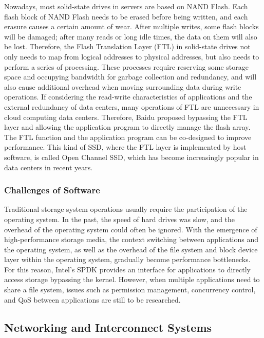Nowadays, most solid-state drives in servers are based on NAND Flash. Each flash block of NAND Flash needs to be erased before being written, and each erasure causes a certain amount of wear. After multiple writes, some flash blocks will be damaged; after many reads or long idle times, the data on them will also be lost. Therefore, the Flash Translation Layer (FTL) in solid-state drives not only needs to map from logical addresses to physical addresses, but also needs to perform a series of processing. These processes require reserving some storage space and occupying bandwidth for garbage collection and redundancy, and will also cause additional overhead when moving surrounding data during write operations. If considering the read-write characteristics of applications and the external redundancy of data centers, many operations of FTL are unnecessary in cloud computing data centers. Therefore, Baidu \cite{ouyang2013active} proposed bypassing the FTL layer and allowing the application program to directly manage the flash array. The FTL function and the application program can be co-designed to improve performance. This kind of SSD, where the FTL layer is implemented by host software, is called Open Channel SSD, which has become increasingly popular in data centers in recent years.

\subsubsection{Challenges of Software}

Traditional storage system operations usually require the participation of the operating system. In the past, the speed of hard drives was slow, and the overhead of the operating system could often be ignored. With the emergence of high-performance storage media, the context switching between applications and the operating system, as well as the overhead of the file system and block device layer within the operating system, gradually become performance bottlenecks. For this reason, Intel's SPDK \cite{spdk} provides an interface for applications to directly access storage bypassing the kernel. However, when multiple applications need to share a file system, issues such as permission management, concurrency control, and QoS between applications are still to be researched.

\subsection{Networking and Interconnect Systems}

